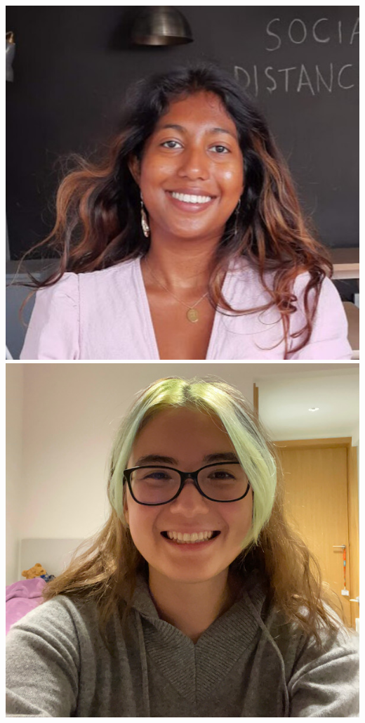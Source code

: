 \documentclass[aspectratio=169]{beamer}
\begin{document}
\begin{frame}
{            \includegraphics[width=0.1\textheight]{figures/students/metha_prathaban.jpg}%
            \includegraphics[width=0.1\textheight]{figures/students/sinah_legner.jpg}%
}
\end{frame}
\end{document}
